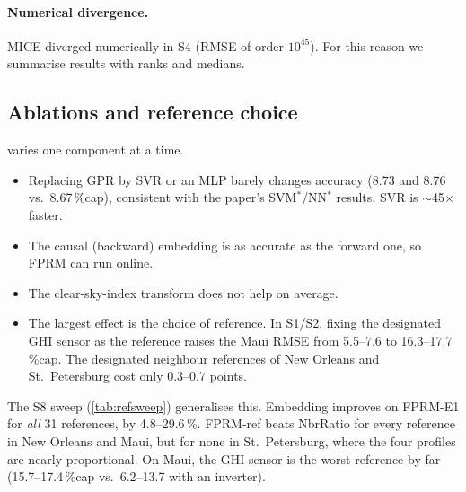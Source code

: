 \documentclass[11pt,a4paper]{article}
\newcommand{\tabdir}{../tables/en}
\newcommand{\pct}{\,\%}
\begin{document}
\paragraph{Numerical divergence.}
MICE diverged numerically in S4 (RMSE of order $10^{45}$).
For this reason we summarise results with ranks and medians.

\subsection{Ablations and reference choice}\label{sec:ablation}

 varies one component at a time.
\begin{itemize}
  \item Replacing GPR by SVR or an MLP barely changes accuracy (8.73 and 8.76 vs.\ 8.67\pct{}cap), consistent with the paper's SVM$^*$/NN$^*$ results. SVR is $\sim$45$\times$ faster.
  \item The causal (backward) embedding is as accurate as the forward one, so FPRM can run online.
  \item The clear-sky-index transform does not help on average.
  \item The largest effect is the choice of reference. In S1/S2, fixing the designated GHI sensor as the reference raises the Maui RMSE from 5.5--7.6 to 16.3--17.7\pct{}cap. The designated neighbour references of New Orleans and St.\ Petersburg cost only 0.3--0.7 points.
\end{itemize}

The S8 sweep (\cref{tab:refsweep}) generalises this.
Embedding improves on FPRM-E1 for \emph{all} 31 references, by 4.8--29.6\pct{}.
FPRM-ref beats NbrRatio for every reference in New Orleans and Maui, but for none in St.\ Petersburg, where the four profiles are nearly proportional.
On Maui, the GHI sensor is the worst reference by far (15.7--17.4\pct{}cap vs.\ 6.2--13.7 with an inverter).

\begin{table}[t]
  \centering\small
  \caption{FPRM ablations (S1 $r\in\{0.5,0.9\}$, S2 $L\in\{6,24\}$\,h, S6 $r\in\{0.5,0.9\}$; 4 datasets, 3 seeds). RMSE in \%cap; time per incomplete series (fit + predict, one CPU core). $^\dagger$: not in the original paper.}
  \label{tab:ablation}
  
\end{table}

\begin{table}[t]
  \centering\small
  \caption{S8 reference sweep (S6 mask, $r=0.5$, 2 seeds): RMSE (\%cap) range and (mean) over references, mean (min, max) relative gain of FPRM-ref over FPRM-E1, and number of references for which FPRM-ref beats NbrRatio.}
  \label{tab:refsweep}
  \resizebox{\linewidth}{!}{}
\end{table}
\end{document}
